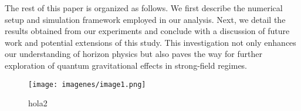 \documentclass{article}\usepackage[utf8]{inputenc} %
\begin{document}
The rest of this paper is organized as follows. We first describe the numerical setup and simulation framework employed in our analysis. Next, we detail the results obtained from our experiments and conclude with a discussion of future work and potential extensions of this study. This investigation not only enhances our understanding of horizon physics but also paves the way for further exploration of quantum gravitational effects in strong-field regimes.\begin{figure}\centering\texttt{[image: imagenes/image1.png]}\caption{hola2}\label{hola3}\end{figure}
\end{document}
